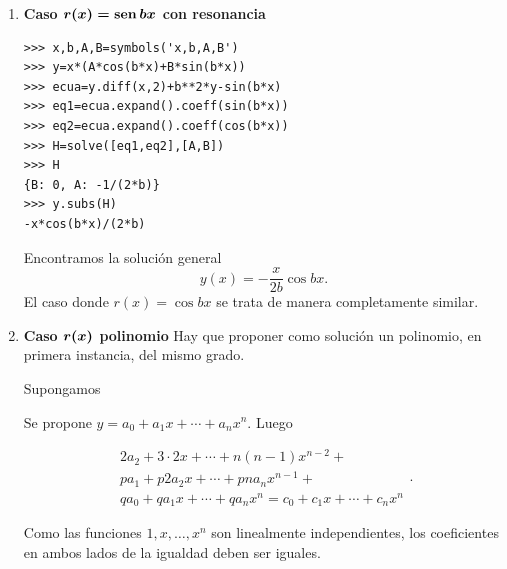 \begin{enumerate}
\item \textbf{Caso $\boldsymbol{r(x)=\operatorname{sen} bx}$ con resonancia}

\begin{lstlisting}
>>> x,b,A,B=symbols('x,b,A,B')
>>> y=x*(A*cos(b*x)+B*sin(b*x))
>>> ecua=y.diff(x,2)+b**2*y-sin(b*x)
>>> eq1=ecua.expand().coeff(sin(b*x))
>>> eq2=ecua.expand().coeff(cos(b*x))
>>> H=solve([eq1,eq2],[A,B])
>>> H
{B: 0, A: -1/(2*b)}
>>> y.subs(H)
-x*cos(b*x)/(2*b)
\end{lstlisting}



Encontramos la solución general
\[\boxed{y(x)=-\frac{x}{2b}\cos bx}.\]
El caso donde $r(x)=\cos bx$ se trata de manera completamente similar.



\item \textbf{Caso $\boldsymbol{r(x)}$ polinomio}
 Hay que proponer como solución un polinomio, en primera instancia, del mismo grado.

 Supongamos


Se propone $y=a_0+a_1x+\cdots+a_nx^n$. Luego

\[\begin{array}{l}
2a_2+3\cdot2x+\cdots+n(n-1)x^{n-2}+\\
pa_1+p2a_2x+\cdots+pna_nx^{n-1}+\\
qa_0+qa_1x+\cdots+qa_nx^n=c_0+c_1x+\cdots+c_nx^n
\end{array}
.\]

Como las funciones $1,x,\ldots,x^n$ son linealmente independientes, los coeficientes en ambos lados de la igualdad deben ser iguales.


\end{enumerate}

